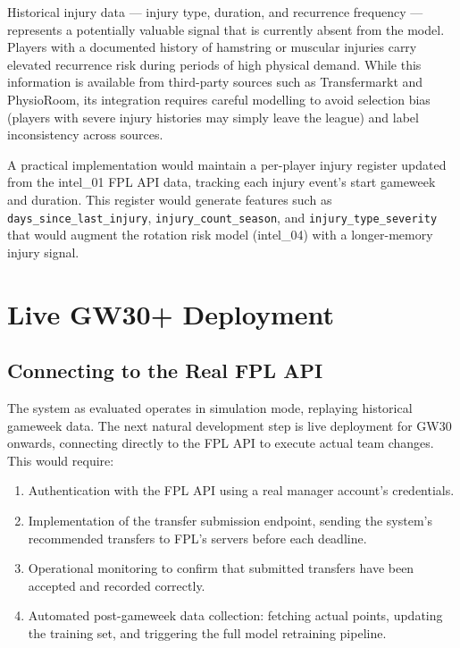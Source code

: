 Historical injury data — injury type, duration, and recurrence frequency — represents a potentially valuable signal that is currently absent from the model. Players with a documented history of hamstring or muscular injuries carry elevated recurrence risk during periods of high physical demand. While this information is available from third-party sources such as Transfermarkt and PhysioRoom, its integration requires careful modelling to avoid selection bias (players with severe injury histories may simply leave the league) and label inconsistency across sources.

A practical implementation would maintain a per-player injury register updated from the intel\_01 FPL API data, tracking each injury event's start gameweek and duration. This register would generate features such as \texttt{days\_since\_last\_injury}, \texttt{injury\_count\_season}, and \texttt{injury\_type\_severity} that would augment the rotation risk model (intel\_04) with a longer-memory injury signal.

\section{Live GW30+ Deployment}

\subsection{Connecting to the Real FPL API}

The system as evaluated operates in simulation mode, replaying historical gameweek data. The next natural development step is live deployment for GW30 onwards, connecting directly to the FPL API to execute actual team changes. This would require:

\begin{enumerate}
  \item Authentication with the FPL API using a real manager account's credentials.
  \item Implementation of the transfer submission endpoint, sending the system's recommended transfers to FPL's servers before each deadline.
  \item Operational monitoring to confirm that submitted transfers have been accepted and recorded correctly.
  \item Automated post-gameweek data collection: fetching actual points, updating the training set, and triggering the full model retraining pipeline.
\end{enumerate}

